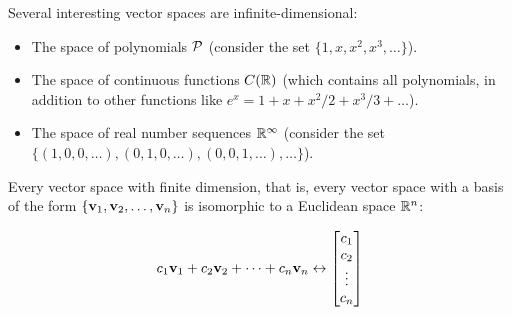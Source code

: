 \begin{applicationActivities}
\begin{observation}
  Several interesting vector spaces are infinite-dimensional:
  \begin{itemize}
    \item The space of polynomials \(\P\) (consider the set
          \(\{1,x,x^2,x^3,\dots\}\)).
    \item The space of continuous functions \(C(\IR)\) (which contains
          all polynomials, in addition to other functions like
          \(e^x=1+x+x^2/2+x^3/3+\dots\)).
    \item The space of real number sequences \(\IR^\infty\) (consider
          the set \(\{(1,0,0,\dots),(0,1,0,\dots),(0,0,1,\dots),\dots\}\)).
  \end{itemize}
\end{observation}

\begin{fact}
  Every vector space with finite dimension, that is, every
  vector space with a basis of the form
  \(\{\vect v_1,\vect v_2,\dots,\vect v_n\}\) is isomorphic to a
  Euclidean space \(\IR^n\):

  \[
    c_1\vect v_1+c_2\vect v_2+\dots+c_n\vect v_n
    \leftrightarrow
    \begin{bmatrix}
      c_1\\c_2\\\vdots\\c_n
    \end{bmatrix}
  \]
\end{fact}

\end{applicationActivities}
